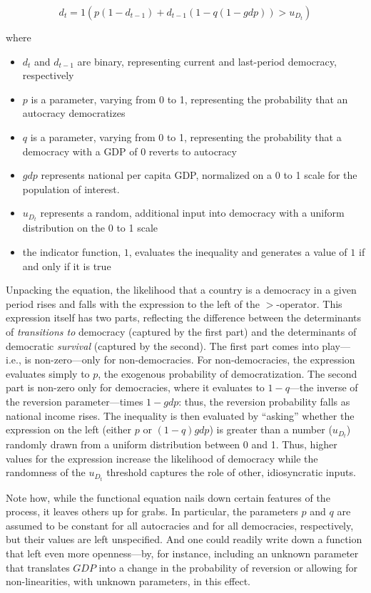 \documentclass[12pt,]{book}
\providecommand{\tightlist}{%
  \setlength{\itemsep}{0pt}\setlength{\parskip}{0pt}}
\begin{document}
\[d_t = 1 (p(1-d_{t-1}) + d_{t-1}(1-q(1-gdp)) > u_{D_t})\]

where

\begin{itemize}
\tightlist
\item
  \(d_t\) and \(d_{t-1}\) are binary, representing current and last-period democracy, respectively
\item
  \(p\) is a parameter, varying from 0 to 1, representing the probability that an autocracy democratizes
\item
  \(q\) is a parameter, varying from 0 to 1, representing the probability that a democracy with a GDP of 0 reverts to autocracy
\item
  \(gdp\) represents national per capita GDP, normalized on a 0 to 1 scale for the population of interest.
\item
  \(u_{D_t}\) represents a random, additional input into democracy with a uniform distribution on the 0 to 1 scale
\item
  the indicator function, \({1}\), evaluates the inequality and generates a value of \(1\) if and only if it is true
\end{itemize}

Unpacking the equation, the likelihood that a country is a democracy in a given period rises and falls with the expression to the left of the \(>\)-operator. This expression itself has two parts, reflecting the difference between the determinants of \emph{transitions to} democracy (captured by the first part) and the determinants of democratic \emph{survival} (captured by the second). The first part comes into play---i.e., is non-zero---only for non-democracies. For non-democracies, the expression evaluates simply to \(p\), the exogenous probability of democratization. The second part is non-zero only for democracies, where it evaluates to \(1-q\)---the inverse of the reversion parameter---times \(1-gdp\): thus, the reversion probability falls as national income rises. The inequality is then evaluated by ``asking'' whether the expression on the left (either \(p\) or \((1-q)gdp\)) is greater than a number (\(u_{D_t}\)) randomly drawn from a uniform distribution between 0 and 1. Thus, higher values for the expression increase the likelihood of democracy while the randomness of the \(u_{D_t}\) threshold captures the role of other, idiosyncratic inputs.

Note how, while the functional equation nails down certain features of the process, it leaves others up for grabs. In particular, the parameters \(p\) and \(q\) are assumed to be constant for all autocracies and for all democracies, respectively, but their values are left unspecified. And one could readily write down a function that left even more openness---by, for instance, including an unknown parameter that translates \(GDP\) into a change in the probability of reversion or allowing for non-linearities, with unknown parameters, in this effect.
\end{document}

